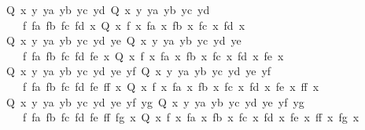 \begin{isabellebody}
\ \ {\isachardoublequoteopen}{\isasymAnd}Q{\isachardot}{\kern0pt}\ {\isasymforall}x{\isachardot}{\kern0pt}\ {\isasymexists}y\ ya\ yb\ yc\ yd{\isachardot}{\kern0pt}\ Q\ x\ y\ ya\ yb\ yc\ yd\ {\isasymLongrightarrow}\isanewline
\ \ \ \ \ {\isasymexists}f\ fa\ fb\ fc\ fd{\isachardot}{\kern0pt}\ {\isasymforall}x{\isachardot}{\kern0pt}\ Q\ x\ {\isacharparenleft}{\kern0pt}f\ x{\isacharparenright}{\kern0pt}\ {\isacharparenleft}{\kern0pt}fa\ x{\isacharparenright}{\kern0pt}\ {\isacharparenleft}{\kern0pt}fb\ x{\isacharparenright}{\kern0pt}\ {\isacharparenleft}{\kern0pt}fc\ x{\isacharparenright}{\kern0pt}\ {\isacharparenleft}{\kern0pt}fd\ x{\isacharparenright}{\kern0pt}{\isachardoublequoteclose}\isanewline
\ \ {\isachardoublequoteopen}{\isasymAnd}Q{\isachardot}{\kern0pt}\ {\isasymforall}x{\isachardot}{\kern0pt}\ {\isasymexists}y\ ya\ yb\ yc\ yd\ ye{\isachardot}{\kern0pt}\ Q\ x\ y\ ya\ yb\ yc\ yd\ ye\ {\isasymLongrightarrow}\isanewline
\ \ \ \ \ {\isasymexists}f\ fa\ fb\ fc\ fd\ fe{\isachardot}{\kern0pt}\ {\isasymforall}x{\isachardot}{\kern0pt}\ Q\ x\ {\isacharparenleft}{\kern0pt}f\ x{\isacharparenright}{\kern0pt}\ {\isacharparenleft}{\kern0pt}fa\ x{\isacharparenright}{\kern0pt}\ {\isacharparenleft}{\kern0pt}fb\ x{\isacharparenright}{\kern0pt}\ {\isacharparenleft}{\kern0pt}fc\ x{\isacharparenright}{\kern0pt}\ {\isacharparenleft}{\kern0pt}fd\ x{\isacharparenright}{\kern0pt}\ {\isacharparenleft}{\kern0pt}fe\ x{\isacharparenright}{\kern0pt}{\isachardoublequoteclose}\isanewline
\ \ {\isachardoublequoteopen}{\isasymAnd}Q{\isachardot}{\kern0pt}\ {\isasymforall}x{\isachardot}{\kern0pt}\ {\isasymexists}y\ ya\ yb\ yc\ yd\ ye\ yf{\isachardot}{\kern0pt}\ Q\ x\ y\ ya\ yb\ yc\ yd\ ye\ yf\ {\isasymLongrightarrow}\isanewline
\ \ \ \ \ {\isasymexists}f\ fa\ fb\ fc\ fd\ fe\ ff{\isachardot}{\kern0pt}\ {\isasymforall}x{\isachardot}{\kern0pt}\ Q\ x\ {\isacharparenleft}{\kern0pt}f\ x{\isacharparenright}{\kern0pt}\ {\isacharparenleft}{\kern0pt}fa\ x{\isacharparenright}{\kern0pt}\ {\isacharparenleft}{\kern0pt}fb\ x{\isacharparenright}{\kern0pt}\ {\isacharparenleft}{\kern0pt}fc\ x{\isacharparenright}{\kern0pt}\ {\isacharparenleft}{\kern0pt}fd\ x{\isacharparenright}{\kern0pt}\ {\isacharparenleft}{\kern0pt}fe\ x{\isacharparenright}{\kern0pt}\ {\isacharparenleft}{\kern0pt}ff\ x{\isacharparenright}{\kern0pt}{\isachardoublequoteclose}\isanewline
\ \ {\isachardoublequoteopen}{\isasymAnd}Q{\isachardot}{\kern0pt}\ {\isasymforall}x{\isachardot}{\kern0pt}\ {\isasymexists}y\ ya\ yb\ yc\ yd\ ye\ yf\ yg{\isachardot}{\kern0pt}\ Q\ x\ y\ ya\ yb\ yc\ yd\ ye\ yf\ yg\ {\isasymLongrightarrow}\isanewline
\ \ \ \ \ {\isasymexists}f\ fa\ fb\ fc\ fd\ fe\ ff\ fg{\isachardot}{\kern0pt}\ {\isasymforall}x{\isachardot}{\kern0pt}\ Q\ x\ {\isacharparenleft}{\kern0pt}f\ x{\isacharparenright}{\kern0pt}\ {\isacharparenleft}{\kern0pt}fa\ x{\isacharparenright}{\kern0pt}\ {\isacharparenleft}{\kern0pt}fb\ x{\isacharparenright}{\kern0pt}\ {\isacharparenleft}{\kern0pt}fc\ x{\isacharparenright}{\kern0pt}\ {\isacharparenleft}{\kern0pt}fd\ x{\isacharparenright}{\kern0pt}\ {\isacharparenleft}{\kern0pt}fe\ x{\isacharparenright}{\kern0pt}\ {\isacharparenleft}{\kern0pt}ff\ x{\isacharparenright}{\kern0pt}\ {\isacharparenleft}{\kern0pt}fg\ x{\isacharparenright}{\kern0pt}{\isachardoublequoteclose}\isanewline

\end{isabellebody}
